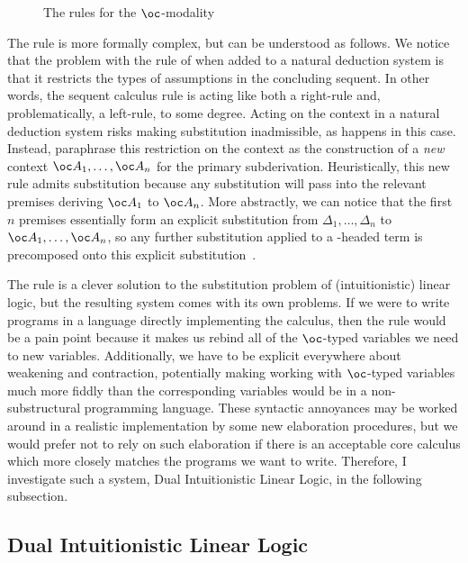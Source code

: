 \begin{figure}
  \caption{The \citet{BBdePH93} rules for the $\oc$-modality}
  \label{fig:BBdePH}
\end{figure}

The \citeauthor{BBdePH93}  rule is more formally complex, but
can be understood as follows.
We notice that the problem with the  rule of
 when added to a natural deduction system is that it
restricts the types of assumptions in the concluding sequent.
In other words, the sequent calculus  rule is acting like
both a right-rule and, problematically, a left-rule, to some degree.
Acting on the context in a natural deduction system risks making substitution
inadmissible, as happens in this case.
Instead, \citeauthor{BBdePH93} paraphrase this restriction on the context as the
construction of a \emph{new} context $\oc A_1, \ldots, \oc A_n$ for the primary
subderivation.
Heuristically, this new  rule admits substitution because any
substitution will pass into the relevant premises deriving $\oc A_1$ to
$\oc A_n$.
More abstractly, we can notice that the first $n$ premises essentially form an
explicit substitution from $\Delta_1, \ldots, \Delta_n$ to
$\oc A_1, \ldots, \oc A_n$, so any further substitution applied
to a -headed term is precomposed onto this explicit
substitution~\citep{ACCL91}.

The \citeauthor{BBdePH93}  rule is a clever solution to the
substitution problem of (intuitionistic) linear logic, but the resulting system
comes with its own problems.
If we were to write programs in a language directly implementing the
\citeauthor{BBdePH93} calculus, then the  rule would be a
pain point because it makes us rebind all of the $\oc$-typed variables we need to
new variables.
Additionally, we have to be explicit everywhere about weakening and contraction,
potentially making working with $\oc$-typed variables much more fiddly than the
corresponding variables would be in a non-substructural programming language.
These syntactic annoyances may be worked around in a realistic implementation by
some new elaboration procedures, but we would prefer not to rely on such
elaboration if there is an acceptable core calculus which more closely matches
the programs we want to write.
Therefore, I investigate such a system, Dual Intuitionistic Linear Logic, in the
following subsection.

\subsection{Dual Intuitionistic Linear Logic}\label{sec:dill}


